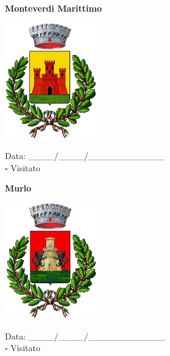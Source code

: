 \documentclass[a5paper,12pt]{article}
\begin{document}
\newpage

\noindent
\begin{minipage}[t]{0.45\textwidth}
    \begin{center}
        \textbf{Monteverdi Marittimo}
    \end{center}
    \vspace{-0.5cm} %
    \begin{center}
        \includegraphics[height= 5cm, width=4cm]{Toscana/Stemma Monteverdi Marittimo.png}
    \end{center}
    \vspace{-0.4cm} %
    \begin{flushleft}
        Data: \_\_\_\_/\_\_\_\_/\_\_\_\_\_\_\_\_\_\_\_\_ \\
        $\square$ Visitato
    \end{flushleft}
\end{minipage}
\hfill
\noindent
\begin{minipage}[t]{0.45\textwidth}
    \begin{center}
        \textbf{Murlo}
    \end{center}
    \vspace{-0.5cm} %
    \begin{center}
        \includegraphics[height= 5cm, width=4cm]{Toscana/Stemma Murlo.png}
    \end{center}
    \vspace{-0.4cm} %
    \begin{flushleft}
        Data: \_\_\_\_/\_\_\_\_/\_\_\_\_\_\_\_\_\_\_\_\_ \\
        $\square$ Visitato
    \end{flushleft}
\end{minipage}
\end{document}
